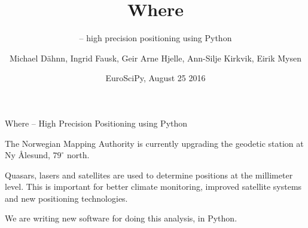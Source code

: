 \documentclass[11pt,table,t]{beamer}
\title{Where}
\subtitle{-- high precision positioning using Python}
\author{Michael Dähnn, Ingrid Fausk, Geir Arne Hjelle, Ann-Silje
  Kirkvik, Eirik Mysen}
\date{EuroSciPy, August 25 2016}
\begin{document}
\begin{frame}{Where -- High Precision Positioning using Python}

  The Norwegian Mapping Authority is currently upgrading the geodetic station at
  Ny {\AA}lesund, $79^\circ$ north.

  \medskip
  Quasars, lasers and satellites are used to determine positions at the
  millimeter level. This is important for better climate monitoring, improved
  satellite systems and new positioning technologies.

  \vspace*{4.2cm}

  We are writing new software for doing this analysis, in Python.
\end{frame}
\end{document}
